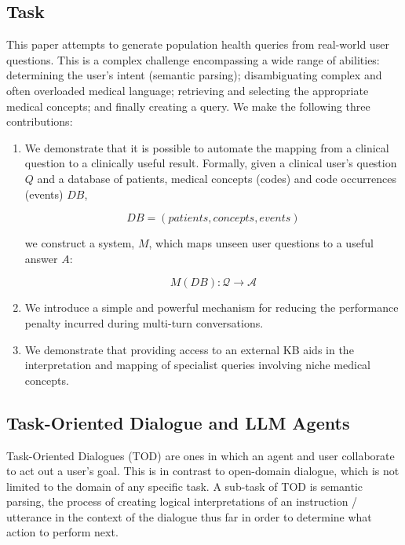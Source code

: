 \documentclass[11pt]{article}
\begin{document}
\subsection{Task}
This paper attempts to generate population health queries from real-world user questions.
This is a complex challenge encompassing a wide range of abilities: determining the user's intent (semantic parsing); disambiguating complex and often overloaded medical language; retrieving and selecting the appropriate medical concepts; and finally creating a query.
We make the following three contributions:

\begin{enumerate}

\item We demonstrate that it is possible to automate the mapping from a clinical question to a clinically useful result. Formally, given a clinical user's question $Q$ and a database of patients, medical concepts (codes) and code occurrences (events) $DB$,

  $$ DB = (patients, concepts, events) $$

we construct a system, $M$, which maps unseen user questions to a useful answer $A$:

  $$ M(DB): \mathcal{Q} \rightarrow \mathcal{A} $$

\item We introduce a simple and powerful mechanism for reducing the performance penalty incurred during multi-turn conversations. %

\item We demonstrate that providing access to an external KB aids in the interpretation and mapping of specialist queries involving niche medical concepts.
\end{enumerate}


\subsection{Task-Oriented Dialogue and LLM Agents}
Task-Oriented Dialogues (TOD) are ones in which an agent and user collaborate to act out a user's goal.
This is in contrast to open-domain dialogue, which is not limited to the domain of any specific task.
A sub-task of TOD is semantic parsing, the process of creating logical interpretations of an instruction / utterance in the context of the dialogue thus far in order to determine what action to perform next.
\end{document}
